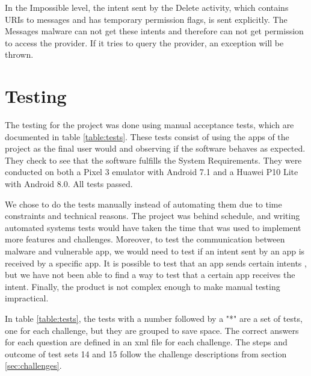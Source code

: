     In the Impossible level, the intent sent by the Delete activity, which contains URIs to messages and has temporary permission flags, is sent explicitly. The Messages malware can not get these intents and therefore can not get permission to access the provider. If it tries to query the provider, an exception will be thrown.
    
    \section{Testing}
        \label{sec:testing}
        
    The testing for the project was done using manual acceptance tests, which are documented in table \ref{table:tests}. These tests consist of using the apps of the project as the final user would and observing if the software behaves as expected. They check to see that the software fulfills the System Requirements. They were conducted on both a Pixel 3 emulator with Android 7.1 and a Huawei P10 Lite with Android 8.0. All tests passed.
    
    We chose to do the tests manually instead of automating them due to time constraints and technical reasons. The project was behind schedule, and writing automated systems tests would have taken the time that was used to implement more features and challenges. Moreover, to test the communication between malware and vulnerable app, we would need to test if an intent sent by an app is received by a specific app. It is possible to test that an app sends certain intents \cite{testing_intents}, but we have not been able to find a way to test that a certain app receives the intent. Finally, the product is not complex enough to make manual testing impractical.
    
    In table \ref{table:tests}, the tests with a number followed by a "*" are a set of tests, one for each challenge, but they are grouped to save space. The correct answers for each question are defined in an xml file for each challenge. The steps and outcome of test sets 14 and 15 follow the challenge descriptions from section \ref{sec:challenges}.
    
